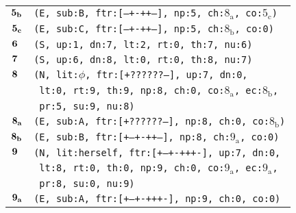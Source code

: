 \documentclass{article}
\begin{document}
\begin{minipage}{\textwidth}
{\begin{tabular}{|r|l|}
    ${\textbf{\textrm{5}}_{\textbf{\textrm{b}}}}$ & \texttt{\texttt{(E,~sub:B,~ftr:[---+-++--],~np:5,~ch:${\textrm{8}_{\textrm{a}}}$,~co:${\textrm{5}_{\textrm{c}}}$)}} \\
    ${\textbf{\textrm{5}}_{\textbf{\textrm{c}}}}$ & \texttt{\texttt{(E,~sub:C,~ftr:[---+-++--],~np:5,~ch:${\textrm{8}_{\textrm{b}}}$,~co:0)}} \\
    ${\textbf{\textrm{6}}_{\phantom{z}}}$ & \texttt{\texttt{(S,~up:1,~dn:7,~lt:2,~rt:0,~th:7,~nu:6)}} \\
    ${\textbf{\textrm{7}}_{\phantom{z}}}$ & \texttt{\texttt{(S,~up:6,~dn:8,~lt:0,~rt:0,~th:8,~nu:7)}} \\
    ${\textbf{\textrm{8}}_{\phantom{z}}}$ & \texttt{\texttt{(N,~lit:$\phi$,~ftr:[+??????--],~up:7,~dn:0,}} \\
    & \texttt{\texttt{~lt:0,~rt:9,~th:9,~np:8,~ch:0,~co:${\textrm{8}_{\textrm{a}}}$,~ec:${\textrm{8}_{\textrm{b}}}$,}} \\
    & \texttt{\texttt{~pr:5,~su:9,~nu:8)}} \\
    ${\textbf{\textrm{8}}_{\textbf{\textrm{a}}}}$ & \texttt{\texttt{(E,~sub:A,~ftr:[+??????--],~np:8,~ch:0,~co:${\textrm{8}_{\textrm{b}}}$)}} \\
    ${\textbf{\textrm{8}}_{\textbf{\textrm{b}}}}$ & \texttt{\texttt{(E,~sub:B,~ftr:[+--+-++--],~np:8,~ch:${\textrm{9}_{\textrm{a}}}$,~co:0)}} \\
    ${\textbf{\textrm{9}}_{\phantom{z}}}$ & \texttt{\texttt{(N,~lit:herself,~ftr:[+--+-+++-],~up:7,~dn:0,}} \\
    & \texttt{\texttt{~lt:8,~rt:0,~th:0,~np:9,~ch:0,~co:${\textrm{9}_{\textrm{a}}}$,~ec:${\textrm{9}_{\textrm{a}}}$,}} \\
    & \texttt{\texttt{~pr:8,~su:0,~nu:9)}} \\
    ${\textbf{\textrm{9}}_{\textbf{\textrm{a}}}}$ & \texttt{\texttt{(E,~sub:A,~ftr:[+--+-+++-],~np:9,~ch:0,~co:0)}} \\
    \hline
  \end{tabular}
  }
\end{minipage}
\bigbreak
\end{document}
